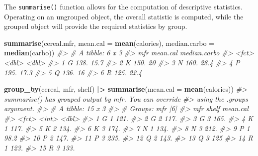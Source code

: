 \documentclass[
]{book}
\newenvironment{Shaded}{\begin{snugshade}}{\end{snugshade}}
\newcommand{\AttributeTok}[1]{\textcolor[rgb]{0.13,0.29,0.53}{#1}}
\newcommand{\CommentTok}[1]{\textcolor[rgb]{0.56,0.35,0.01}{\textit{#1}}}
\newcommand{\FunctionTok}[1]{\textcolor[rgb]{0.13,0.29,0.53}{\textbf{#1}}}
\newcommand{\NormalTok}[1]{#1}
\newcommand{\SpecialCharTok}[1]{\textcolor[rgb]{0.81,0.36,0.00}{\textbf{#1}}}
\begin{document}
The \texttt{summarise()} function allows for the computation of descriptive statistics. Operating on an ungrouped object, the overall statistic is computed, while the grouped object will provide the required statistics by group.

\begin{Shaded}
\begin{Highlighting}[]
\FunctionTok{summarise}\NormalTok{(cereal.mfr, }\AttributeTok{mean.cal =} \FunctionTok{mean}\NormalTok{(calories), }
          \AttributeTok{median.carbo =} \FunctionTok{median}\NormalTok{(carbo))}
\CommentTok{\#\textgreater{} \# A tibble: 6 x 3}
\CommentTok{\#\textgreater{}   mfr   mean.cal median.carbo}
\CommentTok{\#\textgreater{}   \textless{}fct\textgreater{}    \textless{}dbl\textgreater{}        \textless{}dbl\textgreater{}}
\CommentTok{\#\textgreater{} 1 G         138.         15.7}
\CommentTok{\#\textgreater{} 2 K         150.         20  }
\CommentTok{\#\textgreater{} 3 N         160.         28.4}
\CommentTok{\#\textgreater{} 4 P         195.         17.3}
\CommentTok{\#\textgreater{} 5 Q         136.         16  }
\CommentTok{\#\textgreater{} 6 R         125.         22.4}

\FunctionTok{group\_by}\NormalTok{(cereal, mfr, shelf) }\SpecialCharTok{|\textgreater{}} 
    \FunctionTok{summarise}\NormalTok{(}\AttributeTok{mean.cal =} \FunctionTok{mean}\NormalTok{(calories))}
\CommentTok{\#\textgreater{} \textasciigrave{}summarise()\textasciigrave{} has grouped output by \textquotesingle{}mfr\textquotesingle{}. You can override}
\CommentTok{\#\textgreater{} using the \textasciigrave{}.groups\textasciigrave{} argument.}
\CommentTok{\#\textgreater{} \# A tibble: 15 x 3}
\CommentTok{\#\textgreater{} \# Groups:   mfr [6]}
\CommentTok{\#\textgreater{}    mfr   shelf mean.cal}
\CommentTok{\#\textgreater{}    \textless{}fct\textgreater{} \textless{}int\textgreater{}    \textless{}dbl\textgreater{}}
\CommentTok{\#\textgreater{}  1 G         1    121. }
\CommentTok{\#\textgreater{}  2 G         2    117. }
\CommentTok{\#\textgreater{}  3 G         3    165. }
\CommentTok{\#\textgreater{}  4 K         1    117. }
\CommentTok{\#\textgreater{}  5 K         2    134. }
\CommentTok{\#\textgreater{}  6 K         3    174. }
\CommentTok{\#\textgreater{}  7 N         1    134. }
\CommentTok{\#\textgreater{}  8 N         3    212. }
\CommentTok{\#\textgreater{}  9 P         1     98.2}
\CommentTok{\#\textgreater{} 10 P         2    147. }
\CommentTok{\#\textgreater{} 11 P         3    235. }
\CommentTok{\#\textgreater{} 12 Q         2    143. }
\CommentTok{\#\textgreater{} 13 Q         3    125  }
\CommentTok{\#\textgreater{} 14 R         1    123. }
\CommentTok{\#\textgreater{} 15 R         3    133.}


\end{Highlighting}
\end{Shaded}
\end{document}
